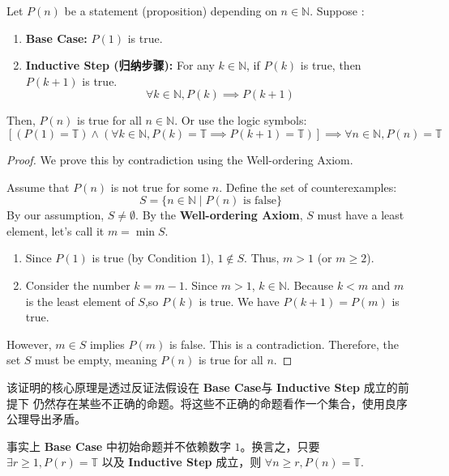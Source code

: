 \documentclass[
	UTF-8,
	11pt, %
	a4paper, %
]{LegrandOrangeBook}
\begin{document}
    \begin{theorem}
    Let $P(n)$ be a statement (proposition) depending on $n \in \mathbb{N}$. Suppose :
    \begin{enumerate}
        \item \textbf{Base Case:} $P(1)$ is true.
        \item \textbf{Inductive Step (归纳步骤):} For any $k \in \mathbb{N}$, if $P(k)$ is true, then $P(k+1)$ is true.
        \[ \forall k \in \mathbb{N}, P(k) \implies P(k+1) \]
    \end{enumerate}
    Then, $P(n)$ is true for all $n \in \mathbb{N}$. Or use the logic symbols:
    \[  \left[ \left( P(1) = \mathbb{T}\right) \land \left( \forall k \in \mathbb{N}, P(k)= \mathbb{T} \implies P(k+1)= \mathbb{T} \right)  \right] \implies \forall n \in \mathbb{N}, P(n) = \mathbb{T} \]
    \end{theorem}

    \begin{proof}
    We prove this by contradiction using the Well-ordering Axiom.

    Assume that $P(n)$ is not true for some $n$. Define the set of counterexamples:
    \[ S = \{ n \in \mathbb{N} \mid P(n) \text{ is false} \} \]
    By our assumption, $S \neq \emptyset$. By the \textbf{Well-ordering Axiom}, $S$ must have a least element, let's call it $m = \min S$.

    \begin{enumerate}
        \item Since $P(1)$ is true (by Condition 1), $1 \notin S$. Thus, $m > 1$ (or $m \ge 2$).
        \item Consider the number $k = m - 1$. Since $m > 1$, $k \in \mathbb{N}$.
        Because $k < m$ and $m$ is the least element of $S$,so $P(k)$ is true.
        We have $P(k+1) = P(m)$ is true.
    \end{enumerate}
    However, $m \in S$ implies $P(m)$ is false. This is a contradiction. Therefore, the set $S$ must be empty, meaning $P(n)$ is true for all $n$.
    \end{proof}

    \begin{remark}
        该证明的核心原理是透过反证法假设在 \textbf{Base Case}与 \textbf{Inductive Step} 成立的前提下
        仍然存在某些不正确的命题。将这些不正确的命题看作一个集合，使用良序公理导出矛盾。
    \end{remark}

    \begin{remark}
        事实上 \textbf{Base Case} 中初始命题并不依赖数字 $1$。换言之，只要 $\exists r\geq 1, P(r) = \mathbb{T}$ 
        以及 \textbf{Inductive Step} 成立，则 $\forall n \geq r, P(n) = \mathbb{T}$.
    \end{remark}
\end{document}
